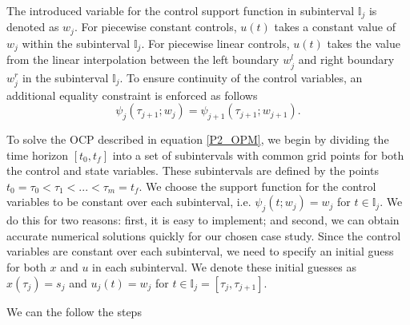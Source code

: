 \documentclass  [
  paper    = a4,
  BCOR     = 10mm,
  twoside,
  fontsize = 12pt,
  fleqn,
  toc      = bibnumbered,
  toc      = listofnumbered,
  numbers  = noendperiod,
  headings = normal,
  listof   = leveldown,
  version  = 3.03
]                                       {scrreprt}
\newcommand{\<}{\langle}
\renewcommand{\>}{\rangle}
\begin{document}
The introduced variable for the control support function in subinterval $\mathbb{I}_j$ is denoted as $w_j$. For piecewise constant controls, $u(t)$ takes a constant value of $w_j$ within the subinterval $\mathbb{I}_j$. For piecewise linear controls, $u(t)$ takes the value from the linear interpolation between the left boundary $w_j^l$ and right boundary $w_j^r$ in the subinterval $\mathbb{I}_j$. To ensure continuity of the control variables, an additional equality constraint is enforced as follows
\begin{equation}
	\psi_j(\tau_{j+1};w_j) =  \psi_{j+1}(\tau_{j+1};w_{j+1}).
\end{equation}

To solve the OCP described in equation \ref{P2_OPM}, we begin by dividing the time horizon $[t_0, t_f]$ into a set of subintervals with common grid points for both the control and state variables. These subintervals are defined by the points $t_0 = \tau_0 < \tau_1 < ... < \tau_m = t_f$. We choose the support function for the control variables to be constant over each subinterval, i.e. $\psi_j(t;w_j) = w_j$ for $t \in \mathbb{I}_j$. We do this for two reasons: first, it is easy to implement; and second, we can obtain accurate numerical solutions quickly for our chosen case study. Since the control variables are constant over each subinterval, we need to specify an initial guess for both $x$ and $u$ in each subinterval. We denote these initial guesses as $x(\tau_j) = s_j$ and $u_j(t) = w_j$ for $t \in \mathbb{I}_j = [\tau_j, \tau_{j+1}]$.

We can the follow the steps
\end{document}
